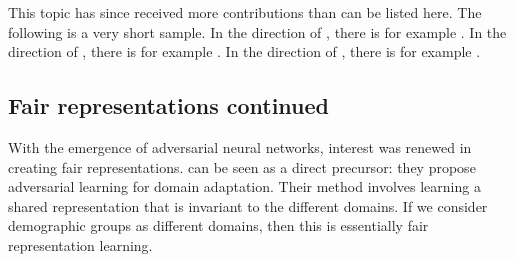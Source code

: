 
This topic has since received more contributions than can be listed here.
The following is a very short sample.
In the direction of \citet{zafar2017fairnessconstraints}, there is for example \citet{quadrianto2017recycling,ustun2019fairness,lohaus2020too}.
In the direction of \citet{kamiran2012data}, there is for example \citet{AgaBeyDudLanetal18,roh2021fairbatch}.
In the direction of \citet{hardt2016equality}, there is for example \citet{kim2019multiaccuracy}.

\subsection{Fair representations continued}
With the emergence of adversarial neural networks, interest was renewed in creating fair representations.
\citet{ganin2016domain} can be seen as a direct precursor:
they propose adversarial learning for domain adaptation.
Their method involves learning a shared representation that is invariant to the different domains.
If we consider demographic groups as different domains, then this is essentially fair representation learning.

